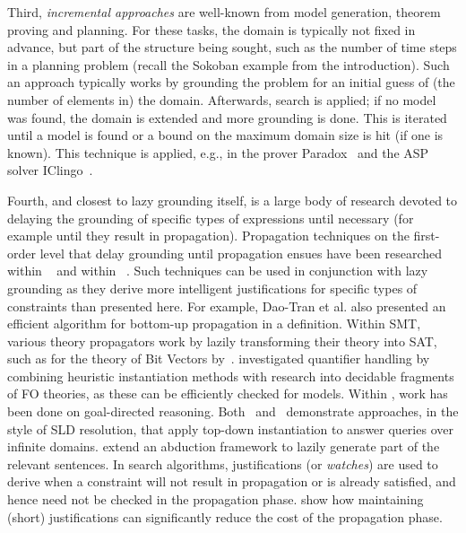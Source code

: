 \documentclass[11pt]{article}
\theoremstyle{plain}
\theoremstyle{definition}
\theoremstyle{example_basic}
\theoremstyle{example_contd}
\theoremstyle{plain}
\newcommand{\change}[1]{#1}
\begin{document}
\change{Third, \emph{incremental approaches} are well-known from model generation, theorem proving and planning.} For these tasks, the domain is typically not fixed in advance, but part of the structure being sought, such as the number of time steps in a planning problem \change{(recall the Sokoban example from the introduction). Such an approach typically works by grounding the problem for an initial guess of (the number of elements in) the domain.} Afterwards, search is applied; if no model was found, the domain is extended and more grounding is done. This is iterated until a model is found or a bound on the maximum domain size is hit (if one is known). This technique is applied, e.g., in the prover Paradox~\cite{model/ClaessenS03} and the ASP solver IClingo~.

Fourth, and closest to lazy grounding itself, is a large body of research
devoted to delaying the grounding of specific types of expressions until
necessary (for example until they result in propagation). Propagation
techniques on the first-order level that delay grounding until propagation
ensues have been researched within
\ASP~ and
within \CP~\cite{constraints/OhrimenkoSC09}. 
Such techniques can be used in
conjunction with lazy grounding as they derive more intelligent
justifications for specific types of constraints than presented here. For
example, Dao-Tran et al. also presented an efficient
algorithm for bottom-up propagation in a definition. Within SMT, various
theory propagators work by lazily transforming their theory into SAT, such
as for the theory of Bit Vectors by~.  investigated quantifier handling by
combining heuristic instantiation methods with research into decidable
fragments of FO theories, as these can be efficiently checked for
models. Within \ASP, work has been done on goal-directed reasoning. Both~ and~ demonstrate approaches, in the style of SLD resolution, that apply top-down instantiation to answer queries over infinite domains.  extend an abduction framework to lazily generate part of the relevant sentences. In search algorithms, justifications (or \emph{watches}) are used to derive when a constraint will not result in propagation or is already satisfied, and hence need not be checked in the propagation phase.  show how maintaining (short) justifications can significantly reduce the cost of the propagation phase.
\end{document}
